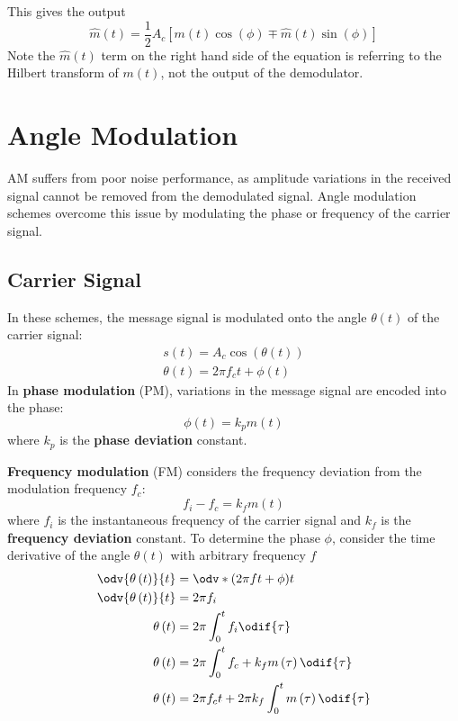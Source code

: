 \documentclass{article}
\begin{document}
This gives the output
\begin{equation*}
    \hat{m}\left( t \right) = \frac{1}{2} A_c \left[ m\left( t \right) \cos{\left( \phi \right)} \mp \hat{m}\left( t \right) \sin{\left( \phi \right)} \right]
\end{equation*}
Note the \(\hat{m}\left( t \right)\) term on the right hand side of the
equation is referring to the Hilbert transform of \(m\left( t \right)\),
not the output of the demodulator.
\section{Angle Modulation}
AM suffers from poor noise performance, as amplitude variations in the
received signal cannot be removed from the demodulated signal. Angle
modulation schemes overcome this issue by modulating the phase or
frequency of the carrier signal.
\subsection{Carrier Signal}
In these schemes, the message signal is modulated onto the angle
\(\theta\left( t \right)\) of the carrier signal:
\begin{gather*}
    s\left( t \right) = A_c \cos{\left( \theta\left( t \right) \right)} \\
    \theta\left( t \right) = 2\pi f_c t + \phi\left( t \right)
\end{gather*}
In \textbf{phase modulation} (PM), variations in the message signal are
encoded into the phase:
\begin{equation*}
    \phi\left( t \right) = k_p m\left( t \right)
\end{equation*}
where \(k_p\) is the \textbf{phase deviation} constant.

\textbf{Frequency modulation} (FM) considers the frequency deviation
from the modulation frequency \(f_c\):
\begin{equation*}
    f_i - f_c = k_f m\left( t \right)
\end{equation*}
where \(f_i\) is the instantaneous frequency of the carrier signal and
\(k_f\) is the \textbf{frequency deviation} constant. To determine the
phase \(\phi\), consider the time derivative of the angle
\(\theta\left( t \right)\) with arbitrary frequency \(f\)
\begin{align*}
    \odv{\theta\left( t \right)}{t} & = \odv*{\left( 2\pi f t + \phi \right)}{t}                        \\
    \odv{\theta\left( t \right)}{t} & = 2\pi f_i                                                        \\
    \theta\left( t \right)          & = 2\pi \int_0^t f_i \odif{\tau}                                   \\
    \theta\left( t \right)          & = 2\pi \int_0^t f_c + k_f m\left( \tau \right) \odif{\tau}        \\
    \theta\left( t \right)          & = 2\pi f_c t + 2\pi k_f \int_0^t m\left( \tau \right) \odif{\tau}
\end{align*}
\end{document}

